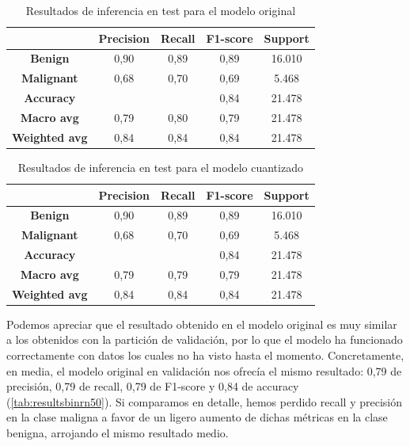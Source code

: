\begin{table}[!ht]
	\centering
	\begin{tabular}{|c|c|c|c|c|}
		\hline
		~ & \textbf{Precision} & \textbf{Recall} & \textbf{F1-score} & \textbf{Support} \\ \hline
		\textbf{Benign} & 0,90 & 0,89 & 0,89 & 16.010 \\ 
		\textbf{Malignant} & 0,68 & 0,70 & 0,69 & 5.468 \\ \hline
		\textbf{Accuracy} & ~ & ~  & 0,84 & 21.478 \\ \hline
		\textbf{Macro avg} & 0,79 & 0,80 & 0,79 & 21.478 \\ 
		\textbf{Weighted avg} & 0,84 & 0,84 & 0,84 & 21.478 \\ \hline
	\end{tabular}
	\caption{Resultados de inferencia en test para el modelo original}
	\label{tab:bintestorig}
\end{table}



\begin{table}[!ht]
	\centering
	\begin{tabular}{|c|c|c|c|c|}
		\hline
		~ & \textbf{Precision} & \textbf{Recall} & \textbf{F1-score} & \textbf{Support} \\ \hline
		\textbf{Benign} & 0,90 & 0,89 & 0,89 & 16.010 \\ 
		\textbf{Malignant} & 0,68 & 0,70 & 0,69 & 5.468 \\ \hline
		\textbf{Accuracy} & ~ & ~  & 0,84 & 21.478 \\ \hline
		\textbf{Macro avg} & 0,79 & 0,79 & 0,79 & 21.478 \\ 
		\textbf{Weighted avg} & 0,84 & 0,84 & 0,84 & 21.478 \\ \hline
	\end{tabular}
	\caption{Resultados de inferencia en test para el modelo cuantizado}
	\label{tab:bintestquant}
\end{table}

Podemos apreciar que el resultado obtenido en el modelo original es muy similar a los obtenidos con la partición de validación, por lo que el modelo ha funcionado correctamente con datos los cuales no ha visto hasta el momento. Concretamente, en media, el modelo original en validación nos ofrecía el mismo resultado:  0,79 de precisión, 0,79 de recall,  0,79  de F1-score y 0,84 de accuracy (\ref{tab:resultsbinrn50}). Si comparamos en detalle, hemos perdido recall y precisión en la clase maligna a favor de un ligero aumento de dichas métricas en la clase benigna, arrojando el mismo resultado medio. 

